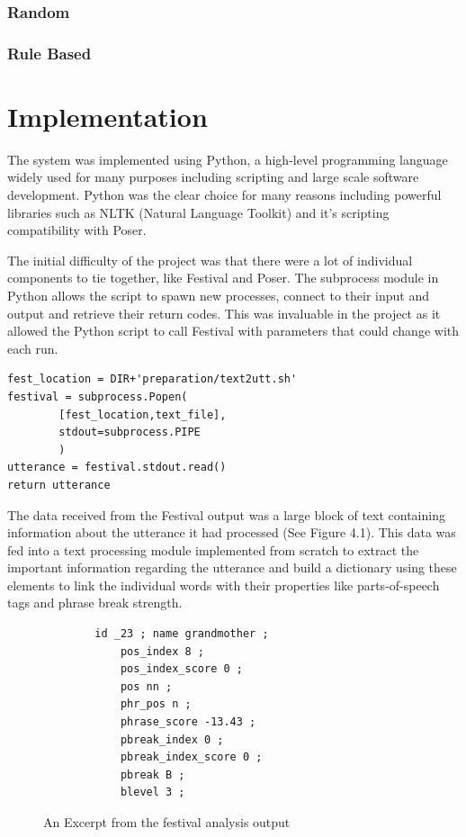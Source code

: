 \documentclass[bsc,frontabs,twoside,singlespacing,parskip]{infthesis}
\begin{document}
\subsection{Random}

\subsection{Rule Based}

\chapter{Implementation}

The system was implemented using Python, a high-level programming language widely used for many purposes including scripting and large scale software development. Python was the clear choice for many reasons including powerful libraries such as NLTK (Natural Language Toolkit) \cite{nltk} and it's scripting compatibility with Poser. 

The initial difficulty of the project was that there were a lot of individual components to tie together, like Festival and Poser. The subprocess module in Python allows the script to spawn new processes, connect to their input and output and retrieve their return codes. This was invaluable in the project as it allowed the Python script to call Festival with parameters that could change with each run.

\begin{lstlisting}
fest_location = DIR+'preparation/text2utt.sh'
festival = subprocess.Popen(
		[fest_location,text_file], 
		stdout=subprocess.PIPE
		)
utterance = festival.stdout.read()
return utterance
\end{lstlisting}

The data received from the Festival output was a large block of text containing information about the utterance it had processed (See Figure 4.1). This data was fed into a text processing module implemented from scratch to extract the important information regarding the utterance and build a dictionary using these elements to link the individual words with their properties like parts-of-speech tags and phrase break strength.

\begin{figure}
	\begin{lstlisting}
		id _23 ; name grandmother ;
			pos_index 8 ;
			pos_index_score 0 ;
			pos nn ; 
			phr_pos n ; 
			phrase_score -13.43 ; 
			pbreak_index 0 ; 
			pbreak_index_score 0 ; 
			pbreak B ; 
			blevel 3 ; 
	\end{lstlisting}
	\caption{An Excerpt from the festival analysis output}
\end{figure}
\end{document}
